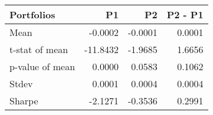 \begin{tabular}{lrrr}
\toprule
Portfolios & P1 & P2 & P2 - P1 \\
\midrule
Mean & -0.0002 & -0.0001 & 0.0001 \\
t-stat of mean & -11.8432 & -1.9685 & 1.6656 \\
p-value of mean & 0.0000 & 0.0583 & 0.1062 \\
Stdev & 0.0001 & 0.0004 & 0.0004 \\
Sharpe & -2.1271 & -0.3536 & 0.2991 \\
\bottomrule
\end{tabular}
